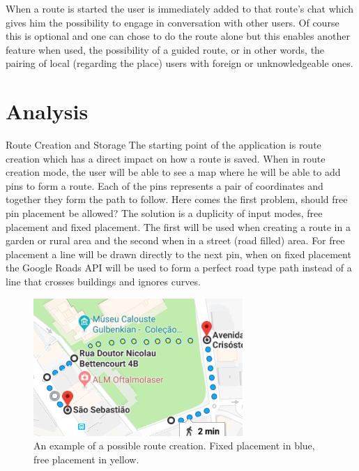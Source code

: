 \documentclass{article}
\begin{document}
    When a route is started the user is immediately added to that route's chat which gives him the possibility to engage in conversation with other users.
    Of course this is optional and one can chose to do the route alone but this enables another feature when used, the possibility of a guided route,
    or in other words, the pairing of local (regarding the place) users with foreign or unknowledgeable ones. 
    

    \newpage
    

    \section*{Analysis}

        \begin{subsection}{Route Creation and Storage}
        The starting point of the application is route creation which has a direct impact on how a route is saved. When in route creation mode, the user
        will be able to see a map where he will be able to add pins to form a route. Each of the pins represents a pair of coordinates and together
        they form the path to follow. Here comes the first problem, should free pin placement be allowed? The solution is a duplicity of input modes, 
        free placement and fixed placement. The first will be used when creating a route in a garden or rural area and the second when in a street (road filled) area. 
        For free placement a line will be drawn directly to the next pin, when on fixed placement the Google Roads API will be used to form a perfect road 
        type path instead of a line that crosses buildings and ignores curves.

            \begin{figure}[h]
                \center
                \caption {An example of a possible route creation. Fixed placement in blue, free placement in yellow.}
                \includegraphics[scale=0.5]{images/route-creation-modes.png}
            \end{figure}    

        \end{subsection}
\end{document}
